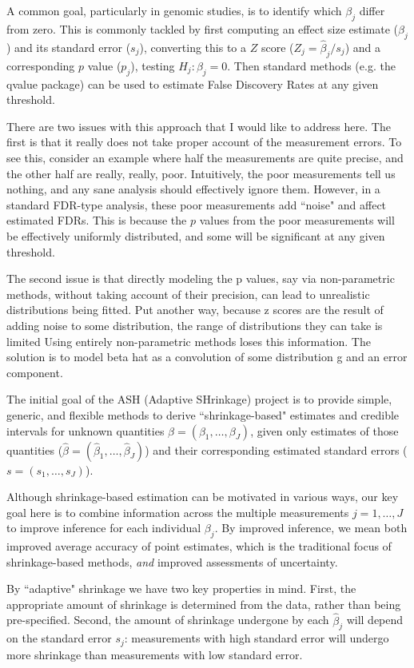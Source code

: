 \documentclass[10pt]{article}
\begin{document}
A common goal, particularly in genomic studies, is to identify which $\beta_j$ differ from zero. This is commonly tackled
by first computing an effect size estimate ($\hat\beta_j$) and its standard error ($s_j$), converting this to a $Z$ score ($Z_j=\hat\beta_j/s_j$)
and a corresponding $p$ value ($p_j$), testing $H_j:\beta_j=0$.  Then standard methods (e.g. the qvalue package) can be used
to estimate False Discovery Rates at any given threshold. 

There are two issues with this approach that I would like to address here. The first is that it really does not take proper account of the measurement errors. To see this, consider an example where half the measurements are quite precise, and the other half are really, really, poor. Intuitively, the poor measurements tell us nothing, and any sane analysis should effectively ignore them. However, in a standard FDR-type analysis, these poor measurements add ``noise" and affect estimated FDRs. This is because the $p$ values from the poor measurements will be effectively uniformly distributed, and some will be significant at any given threshold. 

The second issue is that directly modeling the p values, say via non-parametric methods, without taking account of their precision, 
can lead to unrealistic distributions being fitted. Put another way, because z scores are the result of adding noise to some
distribution, the range of distributions they can take is limited Using entirely non-parametric methods loses this information.
The solution is to model beta hat as a convolution of some distribution g and an error component.

The initial goal of the ASH (Adaptive SHrinkage) project is to provide simple, generic, and flexible methods to derive ``shrinkage-based" estimates and credible intervals for unknown quantities $\beta=(\beta_1,\dots,\beta_J)$, given only estimates of those quantities ($\hat\beta=(\hat\beta_1,\dots, \hat\beta_J)$) and their corresponding estimated standard errors ($s=(s_1,\dots,s_J)$). 

Although shrinkage-based estimation can be motivated in various ways, our key goal here is to combine information across the multiple measurements $j=1,\dots,J$ to improve inference for each individual $\beta_j$. By improved inference, we mean both
improved average accuracy of point estimates, which is
the traditional focus of shrinkage-based methods, \emph{and} improved assessments of uncertainty. 

By ``adaptive" shrinkage we 
have two key properties in mind. First, the appropriate amount of shrinkage is determined from the data, rather than being pre-specified. Second, the amount of shrinkage undergone by each $\hat\beta_j$ will depend on the standard error $s_j$: measurements with high standard error will undergo more shrinkage than measurements with low standard error.
\end{document}
